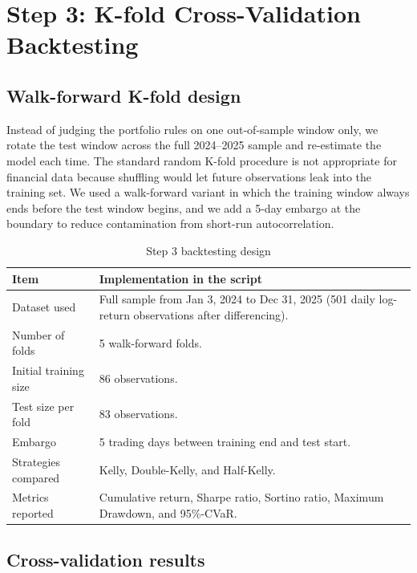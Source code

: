 \documentclass[11pt,a4paper]{article}
\begin{document}
\section{Step 3: K-fold Cross-Validation Backtesting}

\subsection{Walk-forward K-fold design}

Instead of judging the portfolio rules on one
out-of-sample window only, we rotate the test window across the full 2024--2025 sample and
re-estimate the model each time. The standard random K-fold procedure is not appropriate for
financial data because shuffling would let future observations leak into the training set. We used a walk-forward variant in which the training window
always ends before the test window begins, and we add a 5-day embargo at the boundary to
reduce contamination from short-run autocorrelation.

\begin{table}[H]
\centering
\caption{Step 3 backtesting design}
\label{tab:step3_design}
{\small\setlength{\tabcolsep}{4pt}\renewcommand{\arraystretch}{1.15}\begin{tabularx}{\textwidth}{>{\raggedright\arraybackslash}p{4.2cm} X}
\toprule
Item & Implementation in the script \\
\midrule
Dataset used & Full sample from Jan 3, 2024 to Dec 31, 2025 (501 daily log-return observations after differencing). \\
Number of folds & 5 walk-forward folds. \\
Initial training size & 86 observations. \\
Test size per fold & 83 observations. \\
Embargo & 5 trading days between training end and test start. \\
Strategies compared & Kelly, Double-Kelly, and Half-Kelly. \\
Metrics reported & Cumulative return, Sharpe ratio, Sortino ratio, Maximum Drawdown, and 95\%-CVaR. \\
\bottomrule
\end{tabularx}}
\end{table}

\subsection{Cross-validation results}
\end{document}
